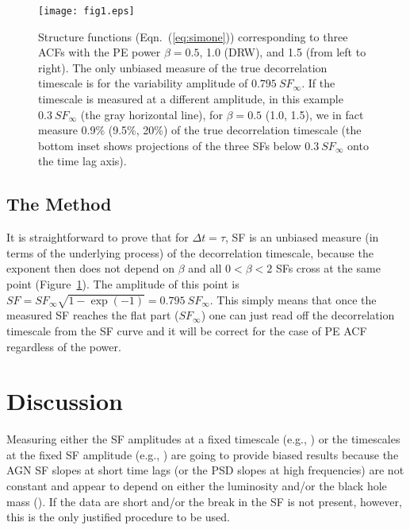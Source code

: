 \documentclass[twocolumn]{aastex6}
\begin{document}
\begin{figure}
\centering
\texttt{[image: fig1.eps]}
\caption{Structure functions (Eqn.~(\ref{eq:simone})) corresponding to three ACFs with the PE power $\beta=0.5$, 1.0 (DRW), and 1.5 (from left to right). 
The only unbiased measure of the true decorrelation timescale is for the variability amplitude of $0.795~SF_\infty$.
If the timescale is measured at a different amplitude, in this example $0.3~SF_\infty$ (the gray horizontal line), 
for $\beta=0.5$ (1.0, 1.5), we in fact measure 0.9\% (9.5\%, 20\%) of the true decorrelation timescale (the bottom inset
shows projections of the three SFs below $0.3~SF_\infty$ onto the time lag axis).}
\label{fig:SF1}
\end{figure}

\subsection{The Method}

It is straightforward to prove that for $\Delta t=\tau$, SF is an unbiased measure (in terms of the underlying process) of the decorrelation timescale, because
the exponent then does not depend on $\beta$ and all $0<\beta<2$ SFs cross at the same point (Figure~\ref{fig:SF1}).
The amplitude of this point is $SF=SF_\infty\sqrt{1-\exp(-1)}=0.795~SF_\infty$. This simply means that once 
the measured SF reaches the flat part ($SF_\infty$) one can just read off the decorrelation timescale 
from the SF curve and it will be correct for the case of PE ACF regardless of the power.


\section{Discussion}
\label{sec:discussion}

Measuring either the SF amplitudes at a fixed timescale (e.g., \citealt{2004ApJ...601..692V,2010ApJ...714.1194S,2014ApJ...784...92M,2016ApJ...817..119K}) 
or the timescales at the fixed SF amplitude (e.g., \citealt{2015ApJ...798...89F,2016arXiv161103082C}) are going to provide biased results because the AGN
SF slopes at short time lags (or the PSD slopes at high frequencies) are not constant and appear to depend on either the luminosity and/or
the black hole mass (\citealt{2016A&A...585A.129S,2016ApJ...826..118K}). If the data are short and/or the break in the SF is not present, however,
this is the only justified procedure to be used.
\end{document}
